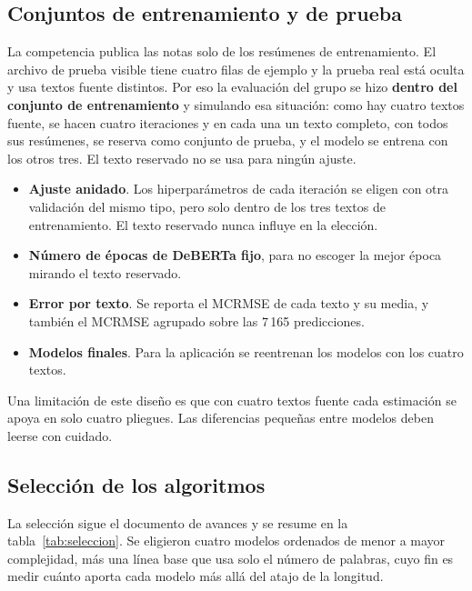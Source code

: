 \documentclass[11pt,a4paper]{article}
\begin{document}
\subsection{Conjuntos de entrenamiento y de prueba}

La competencia publica las notas solo de los resúmenes de entrenamiento. El archivo de prueba visible tiene cuatro filas de ejemplo y la prueba real está oculta y usa textos fuente distintos. Por eso la evaluación del grupo se hizo \textbf{dentro del conjunto de entrenamiento} y simulando esa situación: como hay cuatro textos fuente, se hacen cuatro iteraciones y en cada una un texto completo, con todos sus resúmenes, se reserva como conjunto de prueba, y el modelo se entrena con los otros tres. El texto reservado no se usa para ningún ajuste.

\begin{itemize}[nosep]
\item \textbf{Ajuste anidado}. Los hiperparámetros de cada iteración se eligen con otra validación del mismo tipo, pero solo dentro de los tres textos de entrenamiento. El texto reservado nunca influye en la elección.
\item \textbf{Número de épocas de DeBERTa fijo}, para no escoger la mejor época mirando el texto reservado.
\item \textbf{Error por texto}. Se reporta el MCRMSE de cada texto y su media, y también el MCRMSE agrupado sobre las 7\,165 predicciones.
\item \textbf{Modelos finales}. Para la aplicación se reentrenan los modelos con los cuatro textos.
\end{itemize}

Una limitación de este diseño es que con cuatro textos fuente cada estimación se apoya en solo cuatro pliegues. Las diferencias pequeñas entre modelos deben leerse con cuidado.

\subsection{Selección de los algoritmos}

La selección sigue el documento de avances y se resume en la tabla~\ref{tab:seleccion}. Se eligieron cuatro modelos ordenados de menor a mayor complejidad, más una línea base que usa solo el número de palabras, cuyo fin es medir cuánto aporta cada modelo más allá del atajo de la longitud.
\end{document}
